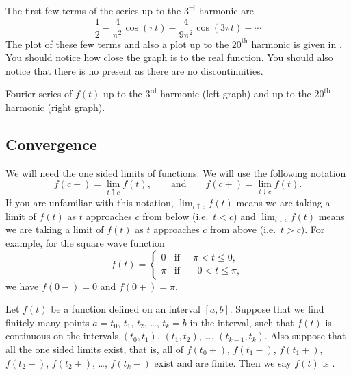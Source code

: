 \begin{example}
The first few terms of the series
up to the $3^{\text{rd}}$ harmonic are
\begin{equation*}
\frac{1}{2} -
\frac{4}{\pi^2} \cos (\pi t)
-
\frac{4}{9 \pi^2} \cos (3 \pi t)
- \cdots
\end{equation*}
The plot of these few terms and also a plot up to the ${20}^{\text{th}}$
harmonic is given in
.  You should notice how close the graph is
to the real function.  You should also notice that there is no
 present as there are no discontinuities.

\begin{myfig}
\capstart
\caption{Fourier series of $f(t)$ up to the $3^{\text{rd}}$ harmonic (left
graph)
and up to the ${20}^{\text{th}}$ harmonic (right graph).\label{gfs:sawcontfsfig}}
\end{myfig}
\end{example}

\subsection{Convergence}

We will need the one sided limits of functions.
We will use the following notation
\begin{equation*}
f(c-) = \lim_{t \uparrow c} f(t),
\qquad \text{and} \qquad
f(c+) = \lim_{t \downarrow c} f(t).
\end{equation*}
If you are unfamiliar with this notation,
$\lim_{t \uparrow c} f(t)$ means we are taking a limit of $f(t)$
as $t$ approaches $c$ from below (i.e.\ $t < c$) and
$\lim_{t \downarrow c} f(t)$ means we are taking a limit of $f(t)$
as $t$ approaches $c$ from above (i.e.\ $t > c$).
For example, for the square wave function
\begin{equation} \label{gfs:sqwaveeq}
f(t) =
\begin{cases}
0 & \text{if } \; {-\pi} < t \leq 0 , \\
\pi & \text{if } \; \phantom{-}0 < t \leq \pi ,
\end{cases}
\end{equation}
we have $f(0-) = 0$ and $f(0+) = \pi$.

Let $f(t)$ be a function defined on an interval $[a,b]$.  Suppose
that we find finitely many points
$a=t_0$, $t_1$, $t_2$, \ldots, $t_k=b$ in
the interval, such that $f(t)$ is continuous
on the intervals
$(t_0,t_1)$, 
$(t_1,t_2)$, \ldots, 
$(t_{k-1},t_k)$.
Also suppose that all the one sided limits exist, that is,
all of
$f(t_0+)$,
$f(t_1-)$,
$f(t_1+)$,
$f(t_2-)$,
$f(t_2+)$,
\ldots,
$f(t_k-)$
exist and are finite.
Then
we say $f(t)$ is \emph{}.

